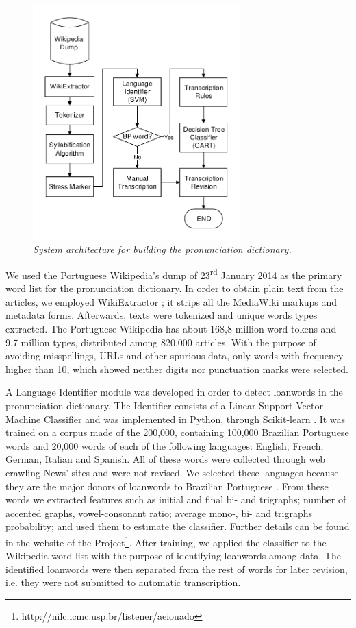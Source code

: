 \begin{figure}[t]
\centerline{ \includegraphics[width=8cm]{./gfx/aeiouado-flowchart-mod.pdf}}
\caption{{\it System architecture for building the pronunciation dictionary.}}
\label{g2p-architecture}
\end{figure}

We used the Portuguese Wikipedia's dump of 23\textsuperscript{rd} January 2014 as the primary word list for the pronunciation dictionary. In order to obtain plain text from the articles, we employed WikiExtractor \cite{Wikiextractor2013}; it strips all the  MediaWiki markups and metadata forms. Afterwards, texts were tokenized and unique words types extracted. The Portuguese Wikipedia has about 168,8 million word tokens and 9,7 million types, distributed among  820,000 articles. With the purpose of avoiding misspellings, URLs and other spurious data, only words with frequency higher than 10, which showed neither digits nor punctuation marks were selected. 

A Language Identifier module was developed in order to detect loanwords in the pronunciation dictionary. The Identifier consists of a Linear Support Vector Machine Classifier \cite{Steinwart2008} and was implemented in Python, through Scikit-learn \cite{Scikit2011}. It was trained on a corpus made of the 200,000, containing 100,000 Brazilian Portuguese words and 20,000 words of each of the following languages: English, French, German, Italian and Spanish. All of these words were collected through web crawling News' sites and were not revised. We selected these languages because they are the major donors of loanwords to Brazilian Portuguese \cite{Alves2001}. From these words we extracted features such as initial and final bi- and trigraphs;  number of accented graphs, vowel-consonant ratio; average mono-, bi- and trigraphs probability; and used them to estimate the classifier. Further details can be found in the website of the Project\footnote{http://nilc.icmc.usp.br/listener/aeiouado}. After training, we applied the classifier to the Wikipedia word list with the purpose of identifying loanwords among data. The identified loanwords were then separated from the rest of words for later revision, i.e. they were not submitted to automatic transcription.

